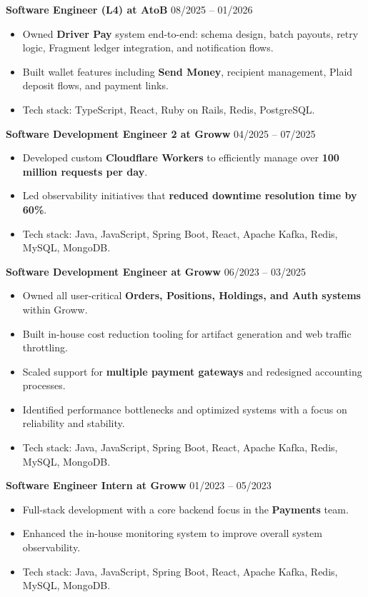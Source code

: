 \documentclass[a4paper,11pt]{article}
\begin{document}
\noindent\textbf{Software Engineer (L4) at AtoB} \hfill 08/2025 -- 01/2026
\begin{itemize}[noitemsep,topsep=0pt,parsep=0pt,partopsep=0pt]
    \item Owned \textbf{Driver Pay} system end-to-end: schema design, batch payouts, retry logic, Fragment ledger integration, and notification flows.
    \item Built wallet features including \textbf{Send Money}, recipient management, Plaid deposit flows, and payment links.
    \item Tech stack: TypeScript, React, Ruby on Rails, Redis, PostgreSQL.
\end{itemize}

\noindent\textbf{Software Development Engineer 2 at Groww} \hfill 04/2025 -- 07/2025
\begin{itemize}[noitemsep,topsep=0pt,parsep=0pt,partopsep=0pt]
    \item Developed custom \textbf{Cloudflare Workers} to efficiently manage over \textbf{100 million requests per day}.
    \item Led observability initiatives that \textbf{reduced downtime resolution time by 60\%}.
    \item Tech stack: Java, JavaScript, Spring Boot, React, Apache Kafka, Redis, MySQL, MongoDB.
\end{itemize}

\noindent\textbf{Software Development Engineer at Groww} \hfill 06/2023 -- 03/2025
\begin{itemize}[noitemsep,topsep=0pt,parsep=0pt,partopsep=0pt]
    \item Owned all user-critical \textbf{Orders, Positions, Holdings, and Auth systems} within Groww.
    \item Built in-house cost reduction tooling for artifact generation and web traffic throttling.
    \item Scaled support for \textbf{multiple payment gateways} and redesigned accounting processes.
    \item Identified performance bottlenecks and optimized systems with a focus on reliability and stability.
    \item Tech stack: Java, JavaScript, Spring Boot, React, Apache Kafka, Redis, MySQL, MongoDB.
\end{itemize}

\noindent\textbf{Software Engineer Intern at Groww} \hfill 01/2023 -- 05/2023
\begin{itemize}[noitemsep,topsep=0pt,parsep=0pt,partopsep=0pt]
    \item Full-stack development with a core backend focus in the \textbf{Payments} team.
    \item Enhanced the in-house monitoring system to improve overall system observability.
    \item Tech stack: Java, JavaScript, Spring Boot, React, Apache Kafka, Redis, MySQL, MongoDB.
\end{itemize}
\end{document}
